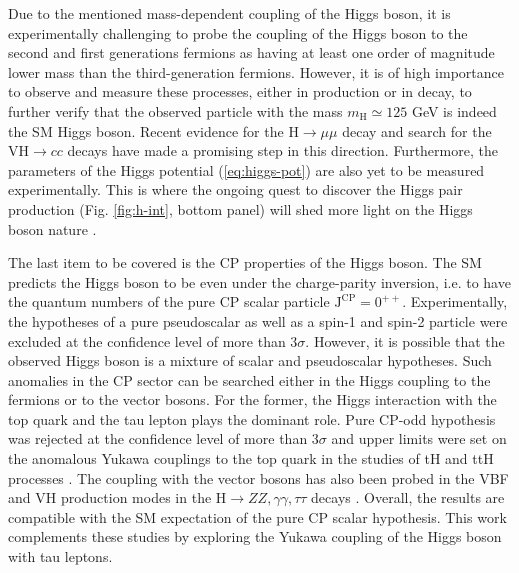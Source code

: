 Due to the mentioned mass-dependent coupling of the Higgs boson, it is experimentally challenging to probe the coupling of the Higgs boson to the second and first generations fermions as having at least one order of magnitude lower mass than the third-generation fermions. However, it is of high importance to observe and measure these processes, either in production or in decay,  to further verify that the observed particle with the mass $m_\text{H} \simeq 125$ GeV is indeed the SM Higgs boson. Recent evidence for the $\text{H} \to \mu\mu$ decay \cite{CMS:2020xwi} and search for the $\text{VH} \to cc$ decays \cite{CMS:2022psv} have made a promising step in this direction. Furthermore, the parameters of the Higgs potential (\ref{eq:higgs-pot}) are also yet to be measured experimentally. This is where the ongoing quest to discover the Higgs pair production (Fig. \ref{fig:h-int}, bottom panel) will shed more light on the Higgs boson nature \cite{CMS:2022dwd}. 

The last item to be covered is the CP properties of the Higgs boson. The SM predicts the Higgs boson to be even under the charge-parity inversion, i.e. to have the quantum numbers of the pure CP scalar particle $\text{J}^\text{CP} = 0^{++}$. Experimentally, the hypotheses of a pure pseudoscalar as well as a spin-1 and spin-2 particle were excluded \cite{CMS:2013fjq, ATLAS:2015zhl} at the confidence level of more than $3\sigma$. However, it is possible that the observed Higgs boson is a mixture of scalar and pseudoscalar hypotheses. Such anomalies in the CP sector can be searched either in the Higgs coupling to the fermions or to the vector bosons. For the former, the Higgs interaction with the top quark and the tau lepton plays the dominant role. Pure CP-odd hypothesis was rejected at the confidence level of more than $3\sigma$ and upper limits were set on the anomalous Yukawa couplings to the top quark in the studies of tH and ttH processes \cite{CMS:2020cga, ATLAS:2020ior, CMS:2022dbt,ATLAS:2022ngt}. The coupling with the vector bosons has also been probed in the VBF and VH production modes in the $\text{H}\to ZZ, \gamma\gamma, \tau\tau$ decays \cite{CMS:2021nnc, Collaboration:2022mlq,ATLAS:2022tan, ATLAS:2022fnp}. Overall, the results are compatible with the SM expectation of the pure CP scalar hypothesis. This work complements these studies by exploring the Yukawa coupling of the Higgs boson with tau leptons.